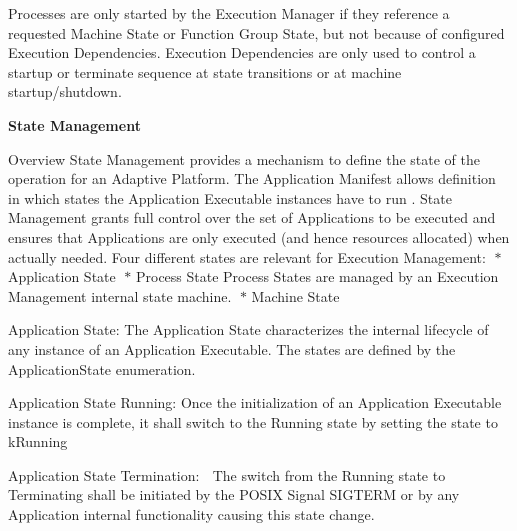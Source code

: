 \begin{DoxyItemize}
\begin{DoxyItemize}
Processes are only started by the Execution Manager if they reference a requested Machine State or Function Group State, but not because of configured Execution Dependencies. Execution Dependencies are only used to control a startup or terminate sequence at state transitions or at machine startup/shutdown.
\end{DoxyItemize}
\item {\bfseries State Management}
\begin{DoxyItemize}
\item Overview State Management provides a mechanism to define the state of the operation for an Adaptive Platform. The Application Manifest allows definition in which states the Application Executable instances have to run . State Management grants full control over the set of Applications to be executed and ensures that Applications are only executed (and hence resources allocated) when actually needed. Four different states are relevant for Execution Management\+: $\ast$ Application State $\ast$ Process State Process States are managed by an Execution Management internal state machine. $\ast$ Machine State
\item Application State\+: The Application State characterizes the internal lifecycle of any instance of an Application Executable. The states are defined by the Application\+State enumeration. 
\begin{DoxyItemize}
\item Application State Running\+: Once the initialization of an Application Executable instance is complete, it shall switch to the Running state by setting the state to k\+Running
\item Application State Termination\+:  The switch from the Running state to Terminating shall be initiated by the P\+O\+S\+IX Signal S\+I\+G\+T\+E\+RM or by any Application internal functionality causing this state change.


\end{DoxyItemize}
\end{DoxyItemize}
\end{DoxyItemize}
